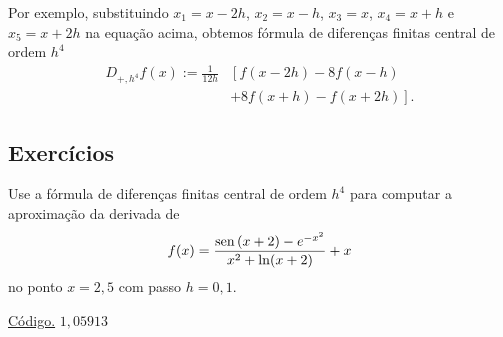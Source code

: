 Por exemplo, substituindo $x_1=x-2h$, $x_2=x-h$, $x_3=x$, $x_4=x+h$ e $x_5=x+2h$ na equação acima, obtemos fórmula de diferenças finitas central de ordem $h^4$
\begin{align}
  D_{+,h^4}f(x) := \frac{1}{12h} &\left[f{\left (x - 2 h\right )} - 8 f{\left(x - h \right )} \right. \nonumber \\
  &+ \left. 8 f{\left (x + h \right )} - f{\left (x + 2 h \right )}\right].\label{eq:dfc_5pts}
\end{align}

\subsection*{Exercícios}

\begin{exer}\label{exer:dfch4_fun}
  Use a fórmula de diferenças finitas central de ordem $h^4$ para computar a aproximação da derivada de
  \begin{equation}
    f(x) = \frac{\operatorname{sen}\,(x+2) - e^{-x^2}}{x^2 + \ln(x+2)}+x
  \end{equation}
no ponto $x=2,5$ com passo $h=0,1$.
\end{exer}
\begin{resp}
  \ifisoctave 
  \href{https://github.com/phkonzen/notas/blob/master/src/MatematicaNumerica/cap_deriv/dados/exer_dfch4_fun/exer_dfch4_fun.m}{Código.} 
  \fi
  $1,05913$
\end{resp}

